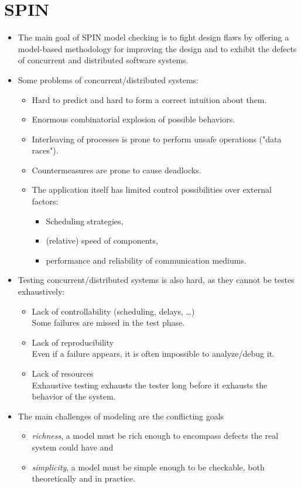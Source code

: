 \documentclass[a4paper, 11pt, accentcolor = tud3b]{tudreport}
\begin{document}
	\chapter{SPIN} %
		\label{c:spin}
	
		
		\begin{itemize}
			\item The main goal of SPIN model checking is to fight design flaws by offering a model-based methodology for improving the design and to exhibit the defects of concurrent and distributed software systems.
			\item Some problems of concurrent/distributed systems:
				\begin{itemize}
					\item Hard to predict and hard to form a correct intuition about them.
					\item Enormous combinatorial explosion of possible behaviors.
					\item Interleaving of processes is prone to perform unsafe operations ("data races").
					\item Countermeasures are prone to cause deadlocks.
					\item The application itself has limited control possibilities over external factors:
						\begin{itemize}
							\item Scheduling strategies,
							\item (relative) speed of components,
							\item performance and reliability of communication mediums.
						\end{itemize}
				\end{itemize}
			\item Testing concurrent/distributed systems is also hard, as they cannot be testes exhaustively:
				\begin{itemize}
					\item Lack of controllability (scheduling, delays, \dots) \\
					Some failures are missed in the test phase.
					\item Lack of reproducibility \\
					Even if a failure appears, it is often impossible to analyze/debug it.
					\item Lack of resources \\
					Exhaustive testing exhausts the tester long before it exhausts the behavior of the system.
				\end{itemize}
			\item The main challenges of modeling are the conflicting goals
				\begin{itemize}
					\item \textit{richness}, a model must be rich enough to encompass defects the real system could have and
					\item \textit{simplicity}, a model must be simple enough to be checkable, both theoretically and in practice.
				\end{itemize}
		\end{itemize}
\end{document}
